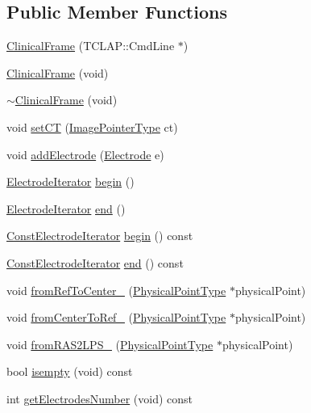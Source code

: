 \subsection*{Public Member Functions}
\begin{DoxyCompactItemize}
\item 
\hyperlink{classClinicalFrame_a63046bc9f1c3c07ea610f2761c83719a}{Clinical\-Frame} (T\-C\-L\-A\-P\-::\-Cmd\-Line $\ast$)
\item 
\hyperlink{classClinicalFrame_a213db09308126a5631c2caef5a3c21a4}{Clinical\-Frame} (void)
\item 
\hyperlink{classClinicalFrame_a3bcff6abc229e1693ae6393ca0377c27}{$\sim$\-Clinical\-Frame} (void)
\item 
void \hyperlink{classClinicalFrame_a7feb4447a4bba0aea5c6581eb3b30e82}{set\-C\-T} (\hyperlink{Definitions_8h_a6952b2a622249cc460a5875f2a793e61}{Image\-Pointer\-Type} ct)
\item 
void \hyperlink{classClinicalFrame_ac18288df5d668d1c2d39ceb1434b0076}{add\-Electrode} (\hyperlink{classElectrode}{Electrode} e)
\item 
\hyperlink{classClinicalFrame_a22b67ee42a429de47c1c12ffedf1a803}{Electrode\-Iterator} \hyperlink{classClinicalFrame_a7b3bdd254b65b20a15483c3fd91dc8de}{begin} ()
\item 
\hyperlink{classClinicalFrame_a22b67ee42a429de47c1c12ffedf1a803}{Electrode\-Iterator} \hyperlink{classClinicalFrame_a03b243aacb896873c20a2354bfe6c29c}{end} ()
\item 
\hyperlink{classClinicalFrame_ab741d0da22f344965de240de63c8a381}{Const\-Electrode\-Iterator} \hyperlink{classClinicalFrame_a11b80ea21454657e3dd1b0778b70df80}{begin} () const 
\item 
\hyperlink{classClinicalFrame_ab741d0da22f344965de240de63c8a381}{Const\-Electrode\-Iterator} \hyperlink{classClinicalFrame_a08380f480fa3f27c75c46f24ed8526a8}{end} () const 
\item 
void \hyperlink{classClinicalFrame_a68cc0496606299638370b19ee5c44f7b}{from\-Ref\-To\-Center\-\_\-} (\hyperlink{Definitions_8h_ab9d62e9721984f22424e47212a5ce25d}{Physical\-Point\-Type} $\ast$physical\-Point)
\item 
void \hyperlink{classClinicalFrame_a36849a62e3bc8414ec7c161007c38493}{from\-Center\-To\-Ref\-\_\-} (\hyperlink{Definitions_8h_ab9d62e9721984f22424e47212a5ce25d}{Physical\-Point\-Type} $\ast$physical\-Point)
\item 
void \hyperlink{classClinicalFrame_a80a3f86750d4818d5d4c2d7a50b4f529}{from\-R\-A\-S2\-L\-P\-S\-\_\-} (\hyperlink{Definitions_8h_ab9d62e9721984f22424e47212a5ce25d}{Physical\-Point\-Type} $\ast$physical\-Point)
\item 
bool \hyperlink{classClinicalFrame_ac94cf8c7ca13d597bcb961d95f7134cc}{isempty} (void) const 
\item 
int \hyperlink{classClinicalFrame_a9f970d38528bbb65dfac9e6fcae23263}{get\-Electrodes\-Number} (void) const 
\end{DoxyCompactItemize}


